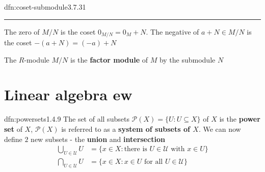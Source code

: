 \documentclass[landscape, 8pt]{extarticle}
\begin{document}
\begin{multicols}{3}
\begin{dfn}{dfn:coset-submodule}{3.7.31}
    \noindent\rule{\textwidth}{0.2pt}
    The zero of $M / N$ is the coset $0_{M /N} = 0_{M} + N$. The negative of $a + N\in M / N$ is the coset $-(a + N) = (-a) + N$

    The $R$-module $M / N$ is the \textbf{factor module} of $M$ by the submodule $N$
\end{dfn}



%
%
%

\section{Linear algebra ew}

\begin{dfn}{dfn:powersets}{1.4.9}
    The set of all subsets $\mathcal{P}(X) = \{U : U\subseteq X\}$ of $X$ is the \textbf{power set} of $X$, $\mathcal{P}(X)$ is referred to as a \textbf{system of subsets of $X$}. We can now define $2$ new subsets - the \textbf{union} and \textbf{intersection}
    \begin{align*}
        \bigcup\limits_{U \in\mathcal{U}} U &= \{x \in X : \text{there is $U\in \mathcal{U}$ with $x\in U$}\} \\
        \bigcap\limits_{U \in\mathcal{U}} U &= \{x \in X : \text{$x\in U$ for all $U\in \mathcal{U}$}\}
    \end{align*}
\end{dfn}


\end{multicols}
\end{document}
